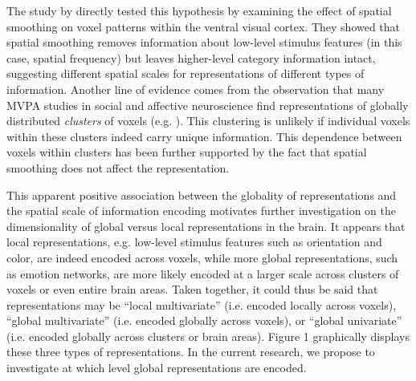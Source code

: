 \documentclass[12pt,a4paper]{article}\usepackage[]{graphicx}\usepackage[]{color}
\begin{document}
The study by \cite{brants2011} directly tested this hypothesis by examining the effect of spatial smoothing on voxel patterns within the ventral visual cortex. They showed that spatial smoothing removes information about low-level stimulus features (in this case, spatial frequency) but leaves higher-level category information intact, suggesting different spatial scales for representations of different types of information. Another line of evidence comes from the observation that many MVPA studies in social and affective neuroscience find representations of globally distributed \emph{clusters} of voxels (e.g. \citealp{oosterwijk2015,kassam2013,corradi2014}). This clustering is unlikely if individual voxels within these clusters indeed carry unique information. This dependence between voxels within clusters has been further supported by the fact that spatial smoothing \citep{oosterwijk2015,kassam2013} does not affect the representation.

This apparent positive association between the globality of representations and the spatial scale of information encoding motivates further investigation on the dimensionality of global versus local representations in the brain. It appears that local representations, e.g. low-level stimulus features such as orientation and color, are indeed encoded across voxels, while more global representations, such as emotion networks, are more likely encoded at a larger scale across clusters of voxels or even entire brain areas. Taken together, it could thus be said that representations may be ``local multivariate'' (i.e. encoded locally across voxels), ``global multivariate'' (i.e. encoded globally across voxels), or ``global univariate'' (i.e. encoded globally across clusters or brain areas). Figure 1 graphically displays these three types of representations. In the current research, we propose to investigate at which level global representations are encoded.
\end{document}

